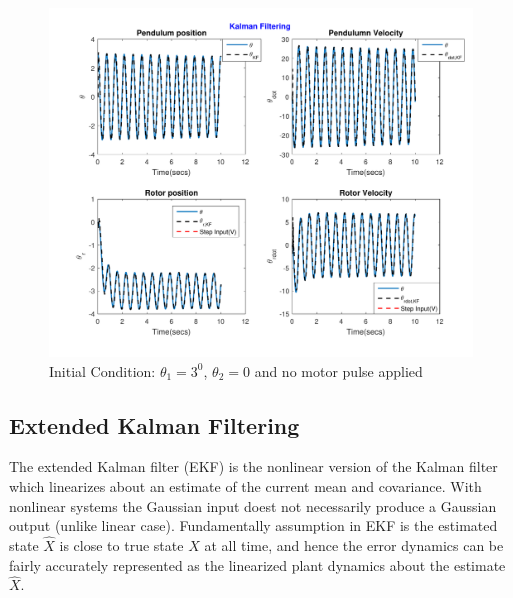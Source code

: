 \documentclass[a4paper]{article}
\begin{document}
\begin{figure}
	\centering
	\includegraphics[width=0.7\linewidth]{fig/plot_1_kf3}
	\caption{Initial Condition: $\theta_1 = 3^0$, $\theta_2 = 0$ and no motor pulse applied}
	\label{fig:plot_1_kf3}
\end{figure}
\subsection{Extended Kalman Filtering}

The extended Kalman filter (EKF) is the nonlinear version of the Kalman filter which linearizes about an estimate of the current mean and covariance. With nonlinear systems the Gaussian input doest not necessarily produce a Gaussian output (unlike linear case). Fundamentally assumption in EKF is the estimated state $\hat X$ is close to true state $X$ at all time, and hence the error dynamics can be fairly accurately represented as the linearized plant dynamics about the estimate $\hat X$.\\
\end{document}
